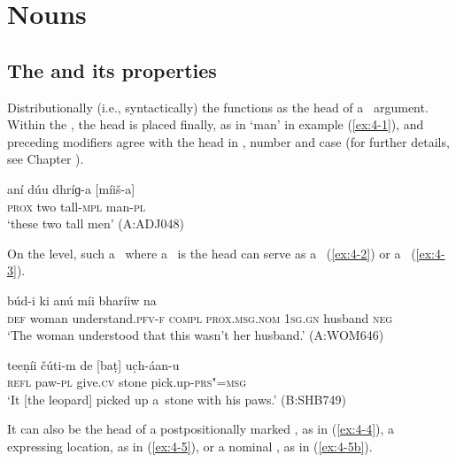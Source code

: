 \chapter{Nouns}
\label{chap:4}

\section{The  and its properties}
\label{sec:4-1}


Distributionally (i.e., syntactically) the  functions as the head of a~  argument. Within the  , the head is placed finally, as in `man' in example (\ref{ex:4-1}), and preceding modifiers agree with the head in , number and case (for further details, see Chapter ).


\begin{exe}
\ex
\label{ex:4-1}
\gll aní dúu dhríɡ-a [míiš-a] \\
	\textsc{prox} two tall-\textsc{mpl} man-\textsc{pl} \\
\glt `these two tall men' (A:ADJ048)
\end{exe}

On the  level, such a~ where a~ is the head can serve as a~ (\ref{ex:4-2}) or a~ (\ref{ex:4-3}).

\begin{exe}
\ex
\label{ex:4-2}
\gll [se kúṛi] búd-i ki anú míi bharíiw na \\
	\textsc{def} woman understand.\textsc{pfv-f} \textsc{compl} \textsc{prox.msg.nom} \textsc{1sg.gn} husband \textsc{neg} \\
\glt `The woman understood that this wasn't her husband.' (A:WOM646)
\end{exe}

\begin{exe}
\ex
\label{ex:4-3}
\gll teeṇíi čúti-m de [baṭ] uc̣h-áan-u \\
	\textsc{refl} paw-\textsc{pl} give.\textsc{cv} stone pick.up-\textsc{prs"=msg} \\
\glt `It [the leopard] picked up a~stone with his paws.' (B:SHB749)
\end{exe}

It can also be the head of a postpositionally marked  , as in (\ref{ex:4-4}), a   expressing location, as in (\ref{ex:4-5}), or a nominal , as in (\ref{ex:4-5b}).

